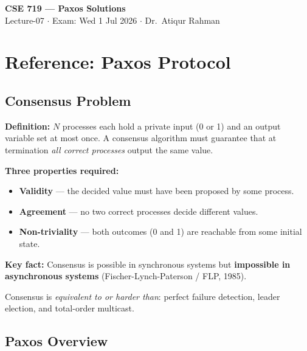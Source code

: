 \documentclass[12pt,a4paper]{article}
\begin{document}
\begin{center}
  {\Large\bfseries CSE 719 --- Paxos Solutions}\\[4pt]
  {\normalsize Lecture-07 $\cdot$ Exam: Wed 1 Jul 2026 $\cdot$ Dr.\ Atiqur Rahman}
\end{center}

\tableofcontents
\newpage

\section{Reference: Paxos Protocol}

\subsection{Consensus Problem}

\textbf{Definition:} $N$ processes each hold a private input (0 or 1) and an output variable set at most once. A consensus algorithm must guarantee that at termination \emph{all correct processes} output the same value.

\textbf{Three properties required:}
\begin{itemize}[noitemsep]
  \item \textbf{Validity} --- the decided value must have been proposed by some process.
  \item \textbf{Agreement} --- no two correct processes decide different values.
  \item \textbf{Non-triviality} --- both outcomes (0 and 1) are reachable from some initial state.
\end{itemize}

\textbf{Key fact:} Consensus is possible in synchronous systems but \textbf{impossible in asynchronous systems} (Fischer-Lynch-Paterson / FLP, 1985).

Consensus is \emph{equivalent to or harder than}: perfect failure detection, leader election, and total-order multicast.

\subsection{Paxos Overview}
\end{document}
